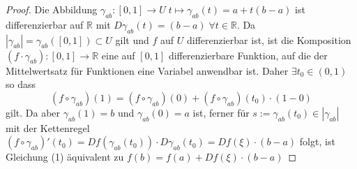 \begin{proof}
	Die Abbildung $ \gamma_{ab}: [0,1] \to U \; t \mapsto \gamma_{ab}(t) = a + t(b-a) $ ist differenzierbar auf $ \mathbb{R}  $ 
	mit $ D \gamma_{ab}(t) = (b-a) \; \forall t \in \mathbb{R}  $. Da $ \left| \gamma_{ab} \right| = \gamma_{ab}([0,1]) \subset  U $
	gilt und $ f $ auf $ U $ differenzierbar ist, ist die Komposition $ \left( f \cdot \gamma_{ab} \right) : [0,1] \to \mathbb{R}  $ 
	eine auf $ [0,1]  $ differenzierbare Funktion, auf die der Mittelwertsatz für Funktionen eine Variabel anwendbar ist. 
	Daher $ \exists t_0 \in (0,1) $ so dass
	\begin{equation}
	\left( f \circ \gamma_{ab} \right) (1) = \left( f \circ \gamma_{ab} \right) (0) + 
	\left( f \circ \gamma_{ab} \right) (t_0) \cdot (1-0)
	\end{equation}
	gilt. Da aber $ \gamma_{ab}(1) = b $ und $ \gamma_{ab}(0) = a $ ist,
	ferner für $ s := \gamma_{ab}(t_0) \in \left| \gamma_{ab} \right| $ mit der Kettenregel $ \left( f \circ \gamma_{ab} \right)'
	(t_0) = Df \left( \gamma _{ab}(t_0) \right) \cdot D \gamma _{ab}(t_0) = Df( \xi) \cdot (b-a)$ folgt, ist Gleichung (1) 
	äquivalent zu $ f(b) = f(a) + Df(\xi)\cdot(b-a) $ 
\end{proof}


%
